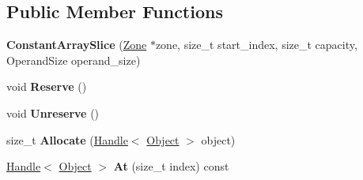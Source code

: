 \subsection*{Public Member Functions}
\begin{DoxyCompactItemize}
\item 
{\bfseries Constant\+Array\+Slice} (\hyperlink{classv8_1_1internal_1_1_zone}{Zone} $\ast$zone, size\+\_\+t start\+\_\+index, size\+\_\+t capacity, Operand\+Size operand\+\_\+size)\hypertarget{structv8_1_1internal_1_1interpreter_1_1_b_a_s_e___e_m_b_e_d_d_e_d_1_1_constant_array_slice_a8202cfc558dafe0466c54acd8b167fb6}{}\label{structv8_1_1internal_1_1interpreter_1_1_b_a_s_e___e_m_b_e_d_d_e_d_1_1_constant_array_slice_a8202cfc558dafe0466c54acd8b167fb6}

\item 
void {\bfseries Reserve} ()\hypertarget{structv8_1_1internal_1_1interpreter_1_1_b_a_s_e___e_m_b_e_d_d_e_d_1_1_constant_array_slice_a24fbbf61ab2f206faa964815f48aac36}{}\label{structv8_1_1internal_1_1interpreter_1_1_b_a_s_e___e_m_b_e_d_d_e_d_1_1_constant_array_slice_a24fbbf61ab2f206faa964815f48aac36}

\item 
void {\bfseries Unreserve} ()\hypertarget{structv8_1_1internal_1_1interpreter_1_1_b_a_s_e___e_m_b_e_d_d_e_d_1_1_constant_array_slice_ad411f7608019e2303785e2a377f3a0b5}{}\label{structv8_1_1internal_1_1interpreter_1_1_b_a_s_e___e_m_b_e_d_d_e_d_1_1_constant_array_slice_ad411f7608019e2303785e2a377f3a0b5}

\item 
size\+\_\+t {\bfseries Allocate} (\hyperlink{classv8_1_1internal_1_1_handle}{Handle}$<$ \hyperlink{classv8_1_1internal_1_1_object}{Object} $>$ object)\hypertarget{structv8_1_1internal_1_1interpreter_1_1_b_a_s_e___e_m_b_e_d_d_e_d_1_1_constant_array_slice_a28bbc14de7fc3ea9029568994fce029f}{}\label{structv8_1_1internal_1_1interpreter_1_1_b_a_s_e___e_m_b_e_d_d_e_d_1_1_constant_array_slice_a28bbc14de7fc3ea9029568994fce029f}

\item 
\hyperlink{classv8_1_1internal_1_1_handle}{Handle}$<$ \hyperlink{classv8_1_1internal_1_1_object}{Object} $>$ {\bfseries At} (size\+\_\+t index) const \hypertarget{structv8_1_1internal_1_1interpreter_1_1_b_a_s_e___e_m_b_e_d_d_e_d_1_1_constant_array_slice_a95141a2967745c12d03c31e406aa90b5}{}\label{structv8_1_1internal_1_1interpreter_1_1_b_a_s_e___e_m_b_e_d_d_e_d_1_1_constant_array_slice_a95141a2967745c12d03c31e406aa90b5}


\end{DoxyCompactItemize}
